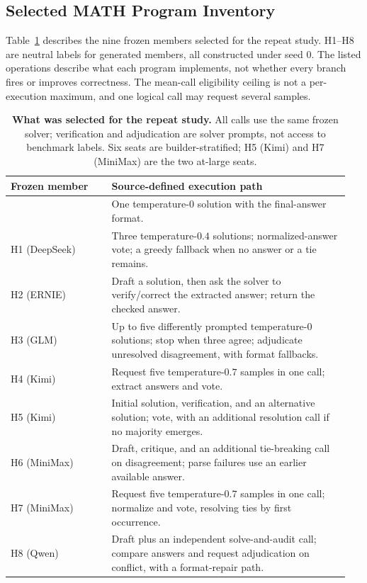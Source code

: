 \subsection{Selected MATH Program Inventory}
\label{app:panel-mechanisms}
Table~\ref{tab:panel-mechanisms} describes the nine frozen members
selected for the repeat study. H1--H8 are neutral labels for generated
members, all constructed under seed $0$. The listed operations describe
what each program implements, not whether every branch fires or improves
correctness. The mean-call eligibility ceiling is not a per-execution
maximum, and one logical call may request several samples.

\begin{table}[htbp]
\centering\small
\begin{tabular}{@{}p{0.29\linewidth}p{0.66\linewidth}@{}}
\toprule
Frozen member & Source-defined execution path \\
\midrule
\bare{} & One temperature-$0$ solution with the final-answer format. \\
H1 (DeepSeek) & Three temperature-$0.4$ solutions; normalized-answer vote; a greedy fallback when no answer or a tie remains. \\
H2 (ERNIE) & Draft a solution, then ask the solver to verify/correct the extracted answer; return the checked answer. \\
H3 (GLM) & Up to five differently prompted temperature-$0$ solutions; stop when three agree; adjudicate unresolved disagreement, with format fallbacks. \\
H4 (Kimi) & Request five temperature-$0.7$ samples in one call; extract answers and vote. \\
H5 (Kimi) & Initial solution, verification, and an alternative solution; vote, with an additional resolution call if no majority emerges. \\
H6 (MiniMax) & Draft, critique, and an additional tie-breaking call on disagreement; parse failures use an earlier available answer. \\
H7 (MiniMax) & Request five temperature-$0.7$ samples in one call; normalize and vote, resolving ties by first occurrence. \\
H8 (Qwen) & Draft plus an independent solve-and-audit call; compare answers and request adjudication on conflict, with a format-repair path. \\
\bottomrule
\end{tabular}
\caption{\textbf{What was selected for the repeat study.} All calls use
the same frozen solver; verification and adjudication are solver prompts,
not access to benchmark labels. Six seats are builder-stratified; H5 (Kimi) and H7 (MiniMax)
are the two at-large seats.}
\label{tab:panel-mechanisms}
\end{table}

